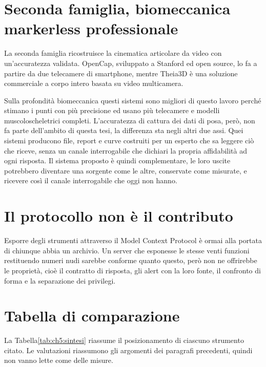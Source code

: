 \section{Seconda famiglia, biomeccanica markerless professionale}
\label{sec:ch5:markerless}

La seconda famiglia ricostruisce la cinematica articolare da video con
un'accuratezza validata. OpenCap\cite{opencap}, sviluppato a Stanford ed open source, lo fa a
partire da due telecamere di smartphone, mentre Theia3D\cite{theia3d} è una
soluzione commerciale a corpo intero basata su video
multicamera.

Sulla profondità biomeccanica questi sistemi sono migliori di questo lavoro 
perché stimano i punti con più precisione ed usano più telecamere e modelli
muscoloscheletrici completi. L'accuratezza di cattura dei dati di posa, però, non fa parte 
dell'ambito di questa tesi, la differenza sta negli altri due assi. Quei sistemi
producono file, report e curve costruiti per un esperto che sa leggere ciò che
riceve, senza un canale interrogabile che dichiari la propria affidabilità ad ogni
risposta. Il sistema proposto è quindi complementare, le loro uscite potrebbero
diventare una sorgente come le altre, conservate come misurate, e ricevere così
il canale interrogabile che oggi non hanno.

\section{Il protocollo non è il contributo}
\label{sec:ch5:protocollo}

Esporre degli strumenti attraverso il Model Context Protocol\cite{mcpspec} è
ormai alla portata di chiunque abbia un archivio. Un server che esponesse le
stesse venti funzioni restituendo numeri nudi sarebbe conforme quanto questo,
però non ne offrirebbe le proprietà, cioè il contratto di risposta, gli alert con
la loro fonte, il confronto di forma e la separazione dei privilegi.

\section{Tabella di comparazione}
\label{sec:ch5:sintesi}

La Tabella\ref{tab:ch5:sintesi} riassume il posizionamento di ciascuno strumento
citato. Le valutazioni riassumono gli argomenti dei paragrafi precedenti, quindi
non vanno lette come delle misure.

